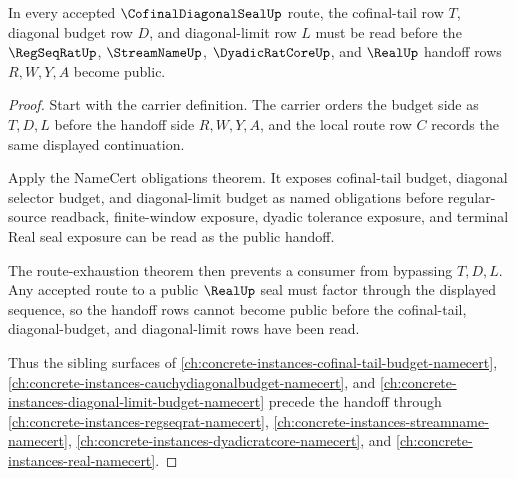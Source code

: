 \begin{theorem}
\label{thm:cofinal-diagonal-seal-route-row-exposure}
In every accepted $\CofinalDiagonalSealUp$ route, the cofinal-tail row $T$, diagonal budget row $D$, and diagonal-limit row $L$ must be read before the $\RegSeqRatUp$, $\StreamNameUp$, $\DyadicRatCoreUp$, and $\RealUp$ handoff rows $R,W,Y,A$ become public.
\end{theorem}
\begin{proof}
Start with the carrier definition. The carrier orders the budget side as $T,D,L$ before the handoff side $R,W,Y,A$, and the local route row $C$ records the same displayed continuation.

Apply the NameCert obligations theorem. It exposes cofinal-tail budget, diagonal selector budget, and diagonal-limit budget as named obligations before regular-source readback, finite-window exposure, dyadic tolerance exposure, and terminal Real seal exposure can be read as the public handoff.

The route-exhaustion theorem then prevents a consumer from bypassing $T,D,L$. Any accepted route to a public $\RealUp$ seal must factor through the displayed sequence, so the handoff rows cannot become public before the cofinal-tail, diagonal-budget, and diagonal-limit rows have been read.

Thus the sibling surfaces of \autoref{ch:concrete-instances-cofinal-tail-budget-namecert}, \autoref{ch:concrete-instances-cauchydiagonalbudget-namecert}, and \autoref{ch:concrete-instances-diagonal-limit-budget-namecert} precede the handoff through \autoref{ch:concrete-instances-regseqrat-namecert}, \autoref{ch:concrete-instances-streamname-namecert}, \autoref{ch:concrete-instances-dyadicratcore-namecert}, and \autoref{ch:concrete-instances-real-namecert}.
\end{proof}

